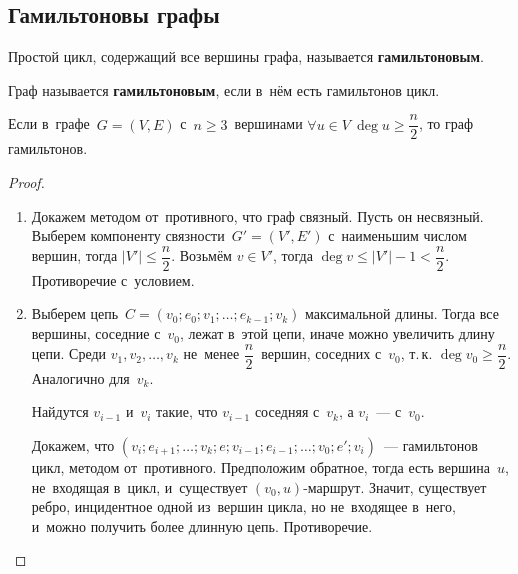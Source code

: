 \subsection{Гамильтоновы графы}
Простой цикл, содержащий все вершины графа, называется \textbf{гамильтоновым}.

Граф называется \textbf{гамильтоновым}, если в~нём есть гамильтонов цикл.

\begin{theorem}[Дирака]
\label{th:Dirac}
Если в~графе~$G = (V, E)$ с~$n \geqslant 3$~вершинами $\forall u \in V \ \deg u \geqslant \dfrac{n}2$, то граф гамильтонов.
\end{theorem}
\begin{proof}
\begin{enumerate}
	\item Докажем методом от~противного, что граф связный.
	Пусть он несвязный.
	Выберем компоненту связности~$G' = (V', E')$ с~наименьшим числом вершин, тогда $|V'| \leqslant \dfrac{n}2$.
	Возьмём $v \in V'$, тогда $\deg v \leqslant |V'| - 1 < \dfrac{n}2$.
	Противоречие с~условием.
	\item Выберем цепь~$C = (v_0; e_0; v_1; \ldots; e_{k-1}; v_k)$ максимальной длины.
	Тогда все вершины, соседние с~$v_0$, лежат в~этой цепи, иначе можно увеличить длину цепи.
	Среди $v_1, v_2, \ldots, v_k$ не~менее $\dfrac{n}2$~вершин, соседних с~$v_0$, т.\,к. $\deg v_0 \geqslant \dfrac{n}2$.
	Аналогично для~$v_k$.
	
	Найдутся $v_{i-1}$ и~$v_i$ такие, что $v_{i-1}$ соседняя с~$v_k$, а $v_i$~--- с~$v_0$.
	
	Докажем, что $(v_i; e_{i+1}; \ldots; v_k; e; v_{i-1}; e_{i-1}; \ldots; v_0; e'; v_i)$~--- гамильтонов цикл, методом от~противного.
	Предположим обратное, тогда есть вершина~$u$, не~входящая в~цикл, и~существует $(v_0, u)$\nobreakdash-\hspace{0pt}маршрут.
	Значит, существует ребро, инцидентное одной из~вершин цикла, но не~входящее в~него, и~можно получить более длинную цепь.
	Противоречие.
\end{enumerate}
\end{proof}

